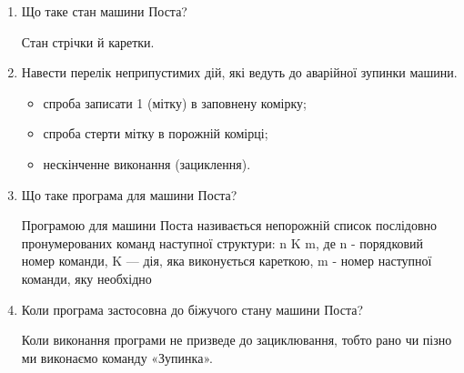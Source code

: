 \documentclass[a4paper, 12pt, oneside]{extarticle}
\begin{document}
\begin{enumerate}
	\item	Що таке стан машини Поста?

		Стан стрічки й каретки.

	\item	Навести перелік неприпустимих дій, які ведуть до аварійної зупинки машини.

		\begin{itemize}

	\item	спроба записати 1 (мітку) в заповнену комірку;
	\item	спроба стерти мітку в порожній комірці;
	\item	нескінченне виконання (зациклення).

		\end{itemize}

	\item	Що таке програма для машини Поста?

	Програмою для машини Поста називається непорожній список
	послідовно пронумерованих команд наступної структури: n K m, де n -
	порядковий номер команди, K --- дія, яка виконується кареткою, m - номер
	наступної команди, яку необхідно

	\item	Коли програма застосовна до біжучого стану машини Поста?

		Коли виконання програми не призведе до
		зациклювання, тобто рано чи пізно ми виконаємо команду «Зупинка».

\end{enumerate}
\end{document}
